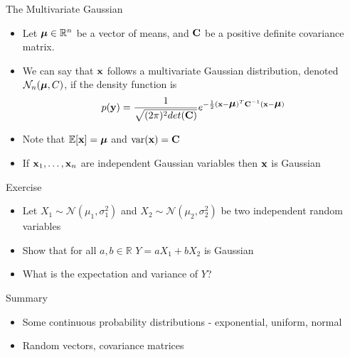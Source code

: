 \documentclass{beamer}
\begin{document}
\begin{frame}{The Multivariate Gaussian}  
\begin{itemize} 
 \item Let $\mbox{\boldmath$\mu$} \in \mathbb{R}^n$ be a vector of means, and $\textbf{C}$ be a positive definite covariance matrix. 
 \item We can say that $\textbf{x}$ follows a multivariate Gaussian distribution, denoted $\mathcal{N}_n(\mbox{\boldmath$\mu$}, C)$, if the density function is 
 \begin{displaymath} 
  p(\textbf{y}) = \frac{1}{\sqrt{(2\pi)^2 det(\textbf{C})}} e^{-\frac{1}{2}(\textbf{x} - \mbox{\boldmath$\mu$})^T\textbf{C}^{-1}(\textbf{x} - \mbox{\boldmath$\mu$})}  
 \end{displaymath}
 \item Note that $\mathbb{E}[\textbf{x}] = \mbox{\boldmath$\mu$}$ and $\mbox{var}(\textbf{x}) = \textbf{C}$  
 \item If $\textbf{x}_1, \ldots, \textbf{x}_n$ are independent Gaussian variables then $\textbf{x}$ is Gaussian 
\end{itemize}
\end{frame}

\begin{frame}{Exercise}  
\begin{itemize} 
 \item Let $X_1 \sim \mathcal{N}(\mu_1, \sigma_1^2)$ and $X_2 \sim \mathcal{N}(\mu_2, \sigma_2^2)$ be two independent random variables 
 \item Show that for all $a, b \in \mathbb{R}$ $Y = aX_1 + bX_2$ is Gaussian
 \item What is the expectation and variance of $Y$? 
\end{itemize}
 
\end{frame}



\begin{frame}{Summary}  
\begin{itemize} 
 \item Some continuous probability distributions - exponential, uniform, normal 
 \item Random vectors, covariance matrices
\end{itemize}
\end{frame}
\end{document}
